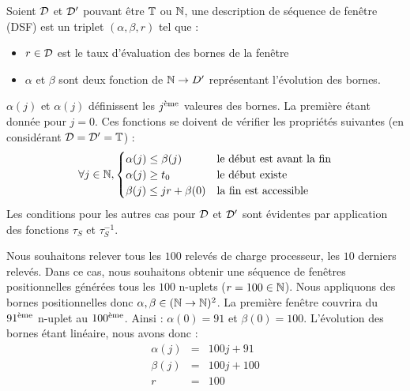 \begin{defi}
    Soient $\mathcal{D}$ et $\mathcal{D}'$ pouvant être $\mathbb{T}$ ou $\mathbb{N}$, une description de séquence de fenêtre (DSF) est un triplet $(\alpha,\beta,r)$ tel que :
\begin{itemize}
    \item $r \in \mathcal{D}$ est le taux d'évaluation des bornes de la fenêtre
    \item $\alpha$ et $\beta$ sont deux fonction de $\mathbb{N}\to D'$ représentant l'évolution des bornes.
\end{itemize}

$\alpha(j)$ et $\alpha(j)$ définissent les $j^{\textrm{\`{e}me}}$ valeures des bornes. La première étant donnée pour $j=0$. Ces fonctions se doivent de vérifier les propriétés suivantes (en considérant $\mathcal{D}=\mathcal{D}'=\mathbb{T}$) :
$$\forall j \in \mathbb{N}, \begin{cases} \alpha(j) \leq \beta(j) & \textrm{le début est avant la fin}\\ \alpha(j) \geq t_0 & \textrm{le début existe} \\ \beta(j) \leq jr + \beta(0) & \textrm{la fin est accessible} \end{cases}$$
    Les conditions pour les autres cas pour $\mathcal{D}$ et $\mathcal{D}'$ sont évidentes par application des fonctions $\tau_S$ et $\tau_S^{-1}$.
\end{defi}

\begin{example}
    Nous souhaitons relever tous les $100$ relevés de charge processeur, les $10$ derniers relevés. Dans ce cas, nous souhaitons obtenir une séquence de fenêtres positionnelles générées tous les $100$ n-uplets ($r=100\in \mathbb{N}$). Nous appliquons des bornes positionnelles donc $\alpha,\beta \in (\mathbb{N}\to\mathbb{N})^2$. La première fenêtre couvrira du $91^{\textrm{\`{e}me}}$ n-uplet au $100^{\textrm{\`{e}me}}$. Ainsi : $\alpha(0) = 91$ et $\beta(0) = 100$. L'évolution des bornes étant linéaire, nous avons donc :
\begin{eqnarray*}
 \alpha(j) &=& 100j+91\\
 \beta(j) &=& 100j + 100\\
 r & = & 100
\end{eqnarray*}
\end{example}

